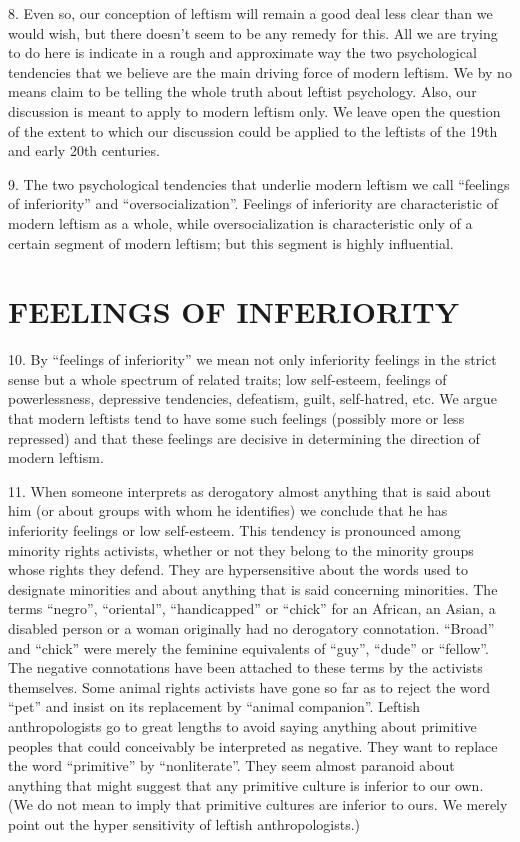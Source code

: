 \documentclass{article}
\begin{document}
8. Even so, our conception of leftism will remain a good deal less clear than we would wish, but 
there doesn’t seem to be any remedy for this. All we are trying to do here is indicate in a rough 
and approximate way the two psychological tendencies that we believe are the main driving force 
of modern leftism. We by no means claim to be telling the whole truth about leftist 
psychology. Also, our discussion is meant to apply to modern leftism only. We leave open the 
question of the extent to which our discussion could be applied to the leftists of the 19th and early 
20th centuries. \vspace{\baselineskip}

9. The two psychological tendencies that underlie modern leftism we call “feelings of inferiority” 
and “oversocialization”. Feelings of inferiority are characteristic of modern leftism as a whole, 
while oversocialization is characteristic only of a certain segment of modern leftism; but this 
segment is highly influential.

\section{FEELINGS OF INFERIORITY}


\hspace{0.5cm} 10. By “feelings of inferiority” we mean not only inferiority feelings in the strict sense but a whole 
spectrum of related traits; low self-esteem, feelings of powerlessness, depressive tendencies, 
defeatism, guilt, self-hatred, etc. We argue that modern leftists tend to have some such feelings 
(possibly more or less repressed) and that these feelings are decisive in determining the direction 
of modern leftism. \vspace{\baselineskip}

11. When someone interprets as derogatory almost anything that is said about him (or about 
groups with whom he identifies) we conclude that he has inferiority feelings or low self-esteem. This tendency is pronounced among minority rights activists, whether or not they belong 
to the minority groups whose rights they defend. They are hypersensitive about the words used to 
designate minorities and about anything that is said concerning minorities. The terms “negro”, 
“oriental”, “handicapped” or “chick” for an African, an Asian, a disabled person or a woman 
originally had no derogatory connotation. “Broad” and “chick” were merely the feminine 
equivalents of “guy”, “dude” or “fellow”. The negative connotations have been attached to these 
terms by the activists themselves. Some animal rights activists have gone so far as to reject the 
word “pet” and insist on its replacement by “animal companion”. Leftish anthropologists go to 
great lengths to avoid saying anything about primitive peoples that could conceivably be 
interpreted as negative. They want to replace the word “primitive” by “nonliterate”. They seem 
almost paranoid about anything that might suggest that any primitive culture is inferior to our 
own. (We do not mean to imply that primitive cultures are inferior to ours. We merely point out 
the hyper sensitivity of leftish anthropologists.) \vspace{\baselineskip}
\end{document}
